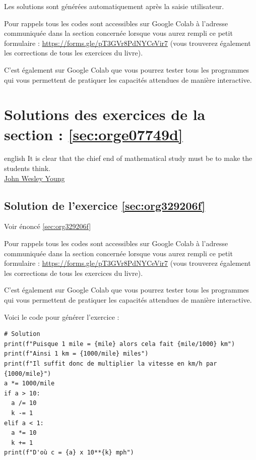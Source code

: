 \documentclass[a4paper, 11pt, twoside]{book}
\begin{document}
Les solutions sont générées automatiquement après la saisie
utilisateur.

Pour rappels tous les codes sont accessibles sur Google Colab à
l'adresse communiquée dans la section concernée lorsque vous
aurez rempli ce petit formulaire :
\url{https://forms.gle/pT3GVr8PdNYCeVir7} (vous trouverez également
les corrections de tous les exercices du livre).

C'est également sur Google Colab que vous pourrez tester tous les
programmes qui vous permettent de pratiquer les capacités attendues
de manière interactive.
\stopcontents[level-2]

\chapter{Solutions des exercices de la section : \ref{sec:orge07749d}}
\label{sec:orgd5714cf}
\startcontents[level-2]

\begin{foreigndisplayquote}{english}
It is clear that the chief end of mathematical study must be to
make the students think.\\

\href{https://en.wikipedia.org/wiki/John\_Wesley\_Young}{John Wesley Young}
\end{foreigndisplayquote}

\section{Solution de l'exercice \ref{sec:org329206f}}
\label{sec:orgfa9b7da}
Voir énoncé \ref{sec:org329206f}

Pour rappels tous les codes sont accessibles sur Google Colab à
l'adresse communiquée dans la section concernée lorsque vous
aurez rempli ce petit formulaire :
\url{https://forms.gle/pT3GVr8PdNYCeVir7} (vous trouverez également
les corrections de tous les exercices du livre).

C'est également sur Google Colab que vous pourrez tester tous les
programmes qui vous permettent de pratiquer les capacités attendues
de manière interactive.

Voici le code pour générer l'exercice :
\begin{verbatim}
# Solution
print(f"Puisque 1 mile = {mile} alors cela fait {mile/1000} km")
print(f"Ainsi 1 km = {1000/mile} miles")
print(f"Il suffit donc de multiplier la vitesse en km/h par {1000/mile}")
a *= 1000/mile
if a > 10:
  a /= 10
  k -= 1
elif a < 1:
  a *= 10
  k += 1
print(f"D'où c = {a} x 10**{k} mph")
\end{verbatim}
\stopcontents[level-2]
\stopcontents[level-1]
\end{document}
